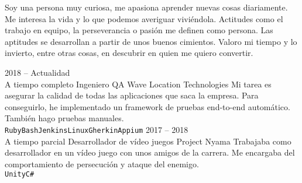 \documentclass[9pt]{developercv} %
\begin{document}
\vspace{0.5cm}



\begin{minipage}[t]{0.4\textwidth} %
	\vspace{-\baselineskip} %
	Soy una persona muy curiosa, me apasiona aprender nuevas cosas diariamente.
	Me interesa la vida y lo que podemos averiguar viviéndola.
	Actitudes como el trabajo en equipo, la perseverancia o pasión me definen como persona.
	Las aptitudes se desarrollan a partir de unos buenos cimientos.
	Valoro mi tiempo y lo invierto, entre otras cosas, en descubrir en quien me quiero convertir.\\
	
\end{minipage}
\hfill %
\begin{minipage}[t]{0.5\textwidth} %
	\vspace{-\baselineskip} %
	\begin{barchart}{5.5}
	\end{barchart}
\end{minipage}



\begin{entrylist}
	\entry
		{2018 -- Actualidad\\\footnotesize{A tiempo completo}}
		{Ingeniero QA}
		{Wave Location Technologies}
		{Mi tarea es asegurar la calidad de todas las aplicaciones que saca la empresa.
		Para conseguirlo, he implementado un framework de pruebas end-to-end automático.
		También hago pruebas manuales.\\ \texttt{Ruby}\slashsep\texttt{Bash}\slashsep\texttt{Jenkins}\slashsep\texttt{Linux}\slashsep\texttt{Gherkin}\slashsep\texttt{Appium}}
	\entry
		{2017 -- 2018\\\footnotesize{A tiempo parcial}}
		{Desarrollador de vídeo juegos}
		{Project Nyama}
		{Trabajaba como desarrollador en un vídeo juego con unos amigos de la carrera.
		Me encargaba del comportamiento de persecución y ataque del enemigo.\\ \texttt{Unity}\slashsep\texttt{C\#}}
\end{entrylist}
\end{document}
